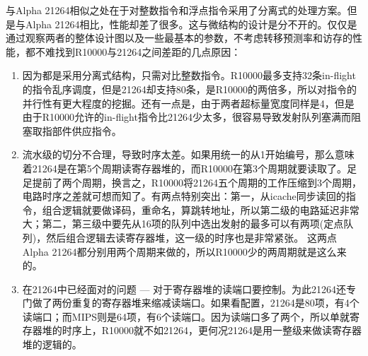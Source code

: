 与Alpha 21264相似之处在于对整数指令和浮点指令采用了分离式的处理方案。但是与Alpha 21264相比，性能却差了很多。这与微结构的设计是分不开的。仅仅是通过观察两者的整体设计图以及一些最基本的参数，不考虑转移预测率和访存的性能，都不难找到R10000与21264之间差距的几点原因：
\begin{enumerate}[label=(\alph*)]
	\item 因为都是采用分离式结构，只需对比整数指令。R10000最多支持32条in-flight的指令乱序调度，但是21264却支持80条，是R10000的两倍多，所以对指令的并行性有更大程度的挖掘。还有一点是，由于两者超标量宽度同样是4，但是由于R10000允许的in-flight指令比21264少太多，很容易导致发射队列塞满而阻塞取指部件供应指令。
	\item 流水级的切分不合理，导致时序太差。如果用统一的从1开始编号，那么意味着21264是在第5个周期读寄存器堆的，而R10000在第3个周期就要读取了。足足提前了两个周期，换言之，R10000将21264五个周期的工作压缩到3个周期，电路时序之差就可想而知了。有两点特别突出：第一，从icache同步读回的指令，组合逻辑就要做译码，重命名，算跳转地址，所以第二级的电路延迟非常大；第二，第三级中要先从16项的队列中选出发射的最多可以有两项(定点队列)，然后组合逻辑去读寄存器堆，这一级的时序也是非常紧张。
	这两点Alpha 21264都分别用两个周期来做的，所以R10000少的两周期就是这么来的。
	\item 在21264中已经面对的问题 --- 对于寄存器堆的读端口要控制。为此21264还专门做了两份重复的寄存器堆来缩减读端口。如果看配置，21264是80项，有4个读端口；而MIPS则是64项，有6个读端口。因为读端口多了两个，所以单就寄存器堆的时序上，R10000就不如21264，更何况21264是用一整级来做读寄存器堆的逻辑的。
\end{enumerate}

